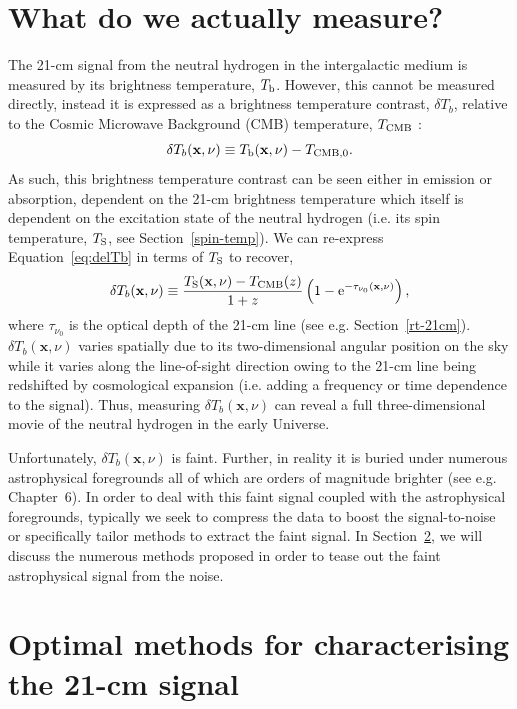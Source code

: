 \section{What do we actually measure?}

The 21-cm signal from the neutral hydrogen in the intergalactic medium is measured by its brightness temperature, $T_{\rm b}$. However, this cannot be measured directly, instead it is expressed as a brightness temperature contrast, $\delta T_{b}$, relative to the Cosmic Microwave Background (CMB) temperature, $T_{\rm CMB}$ \cite{Furlanetto:2006a}: 
\begin{equation} \label{eq:delTb}
\delta T_{b}(\mathbf{x},\nu) \equiv T_{\rm b}(\mathbf{x},\nu) - T_{\rm CMB, 0}.
\end{equation}
As such, this brightness temperature contrast can be seen either in emission or absorption, dependent on the 21-cm brightness temperature which itself is dependent on the excitation state of the neutral hydrogen (i.e. its spin temperature, $T_{\rm S}$, see Section~\ref{spin-temp}). We can re-express Equation~\ref{eq:delTb} in terms of $T_{\rm S}$ to recover,
\begin{equation} \label{eq:delTb_Ts}
\delta T_{b}(\mathbf{x},\nu) \equiv \frac{T_{\rm S}(\mathbf{x},\nu) - T_{\rm CMB}(z)}{1+z} \left( 1 - {\rm e}^{-\tau_{\nu_{0}}(\mathbf{x},\nu) } \right),
\end{equation}
where $\tau_{\nu_{0}}$ is the optical depth of the 21-cm line (see e.g. Section~\ref{rt-21cm}). $\delta T_{b}(\mathbf{x},\nu)$ varies spatially due to its two-dimensional angular position on the sky while it varies along the line-of-sight direction owing to the 21-cm line being redshifted by cosmological expansion (i.e. adding a frequency or time dependence to the signal). Thus, measuring $\delta T_{b}(\mathbf{x},\nu)$ can reveal a full three-dimensional movie of the neutral hydrogen in the early Universe.

Unfortunately, $\delta T_{b}(\mathbf{x},\nu)$ is faint. Further, in reality it is buried under numerous astrophysical foregrounds all of which are orders of magnitude brighter (see e.g. Chapter~6). In order to deal with this faint signal coupled with the astrophysical foregrounds, typically we seek to compress the data to boost the signal-to-noise or specifically tailor methods to extract the faint signal. In Section~\ref{sec:methods}, we will discuss the numerous methods proposed in order to tease out the faint astrophysical signal from the noise.

\section{Optimal methods for characterising the 21-cm signal} \label{sec:methods}

